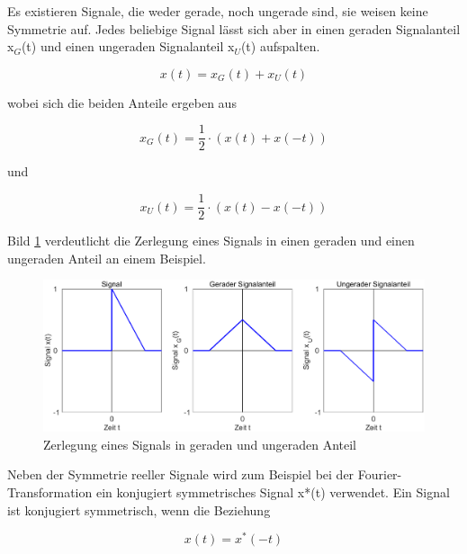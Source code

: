 \noindent Es existieren Signale, die weder gerade, noch ungerade sind, sie weisen keine Symmetrie auf. Jedes beliebige Signal l\"{a}sst sich aber in einen geraden Signalanteil x${}_{G}$(t) und einen ungeraden Signalanteil x${}_{U}$(t) aufspalten. 

\begin{equation}\label{eq:onetwenty}
x\left(t\right)=x_{G} \left(t\right)+x_{U} \left(t\right)
\end{equation}


\noindent wobei sich die beiden Anteile ergeben aus

\begin{equation}\label{eq:onetwentyone}
x_{G} \left(t\right)=\dfrac{1}{2} \cdot \left(x\left(t\right)+x\left(-t\right)\right)
\end{equation}


\noindent und 

\begin{equation}\label{eq:onetwentytwo}
x_{U} \left(t\right)=\dfrac{1}{2} \cdot \left(x\left(t\right)-x\left(-t\right)\right)
\end{equation}


\noindent Bild \ref{fig:GeradeUngerade} verdeutlicht die Zerlegung eines Signals in einen geraden und einen ungeraden Anteil an einem Beispiel.

\begin{figure}[H]
  \includegraphics[width=1.0\textwidth]{Kapitel1/Bilder/image5}
  \caption{Zerlegung eines Signals in geraden und ungeraden Anteil}
  \label{fig:GeradeUngerade}
\end{figure}

\noindent Neben der Symmetrie reeller Signale wird zum Beispiel bei der Fourier-Transformation ein konjugiert symmetrisches Signal x*(t) verwendet. Ein Signal ist konjugiert symmetrisch, wenn die Beziehung 

\begin{equation}\label{eq:onetwentythree}
x(t)=x^{*} (-t)
\end{equation}

